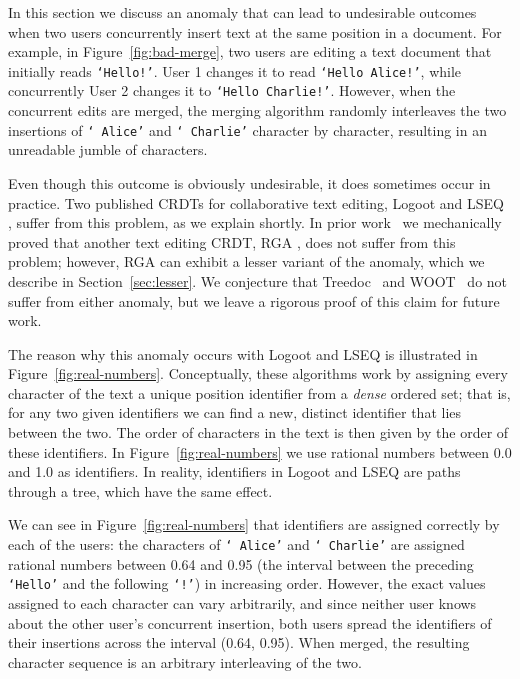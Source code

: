 \documentclass[sigconf]{acmart}
\begin{document}
In this section we discuss an anomaly that can lead to undesirable outcomes when two users concurrently insert text at the same position in a document.
For example, in Figure~\ref{fig:bad-merge}, two users are editing a text document that initially reads \texttt{`Hello!'}.
User 1 changes it to read \texttt{`Hello Alice!'}, while concurrently User 2 changes it to \texttt{`Hello Charlie!'}.
However, when the concurrent edits are merged, the merging algorithm randomly interleaves the two insertions of \texttt{`~Alice'} and \texttt{`~Charlie'} character by character, resulting in an unreadable jumble of characters.

Even though this outcome is obviously undesirable, it does sometimes occur in practice.
Two published CRDTs for collaborative text editing, Logoot \cite{Weiss:2009ht,Weiss:2010hx} and LSEQ \cite{Nedelec:2013ky,Nedelec:2016eo}, suffer from this problem, as we explain shortly.
In prior work~\cite{ExtendedVersion,AFP} we mechanically proved that another text editing CRDT, RGA \cite{Roh:2011dw}, does not suffer from this problem; however, RGA can exhibit a lesser variant of the anomaly, which we describe in Section~\ref{sec:lesser}.
We conjecture that Treedoc~\cite{Preguica:2009fz} and WOOT~\cite{Oster:2006wj} do not suffer from either anomaly, but we leave a rigorous proof of this claim for future work.

The reason why this anomaly occurs with Logoot and LSEQ is illustrated in Figure~\ref{fig:real-numbers}.
Conceptually, these algorithms work by assigning every character of the text a unique position identifier from a \emph{dense} ordered set; that is, for any two given identifiers we can find a new, distinct identifier that lies between the two.
The order of characters in the text is then given by the order of these identifiers.
In Figure~\ref{fig:real-numbers} we use rational numbers between 0.0 and 1.0 as identifiers.
In reality, identifiers in Logoot and LSEQ are paths through a tree, which have the same effect.

We can see in Figure~\ref{fig:real-numbers} that identifiers are assigned correctly by each of the users: the characters of \texttt{` Alice'} and \texttt{` Charlie'} are assigned rational numbers between 0.64 and 0.95 (the interval between the preceding \texttt{`Hello'} and the following \texttt{`!'}) in increasing order.
However, the exact values assigned to each character can vary arbitrarily, and since neither user knows about the other user's concurrent insertion, both users spread the identifiers of their insertions across the interval (0.64, 0.95).
When merged, the resulting character sequence is an arbitrary interleaving of the two.
\end{document}

